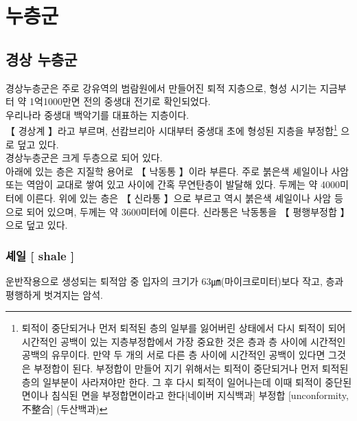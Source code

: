 \documentclass[12pt,a4paper]{book}
\newcommand{\SectionMargin}			{\newpage  \null \vskip 0cm}
\begin{document}
%
%
%
	\newpage
	\chapter{누층군}

	\SectionMargin
	\section{경상 누층군}
	\null

경상누층군은 주로 강유역의 범람원에서 만들어진 퇴적 지층으로, 형성 시기는 지금부터 약 1억1000만면 전의 중생대 전기로 확인되었다.\\

우리나라 중생대 백악기를 대표하는 지층이다.\\

【 경상계 】라고 부르며, 선캄브리아 시대부터 중생대 초에 형성된 지층을 부정합\footnote{퇴적이 중단되거나 먼저 퇴적된 층의 일부를 잃어버린 상태에서 다시 퇴적이 되어 시간적인 공백이 있는 지층부정합에서 가장 중요한 것은 층과 층 사이에 시간적인 공백의 유무이다. 만약 두 개의 서로 다른 층 사이에 시간적인 공백이 있다면 그것은 부정합이 된다. 부정합이 만들어 지기 위해서는 퇴적이 중단되거나 먼저 퇴적된 층의 일부분이 사라져야만 한다. 그 후 다시 퇴적이 일어나는데 이때 퇴적이 중단된 면이나 침식된 면을 부정합면이라고 한다[네이버 지식백과] 부정합 [unconformity, 不整合] (두산백과)} 으로 덮고 있다.\\

경상누층군은 크게 두층으로 되어 있다. \\
아래에 있는 층은 지질학 용어로 【 낙동통 】이라 부른다. 주로 붉은색 셰일이나 사암 또는 역암이 교대로 쌓여 있고 사이에 간혹 무연탄층이 발달해 있다. 두께는 약 4000미터에 이른다. 
위에 있는 층은 【 신라통 】으로 부르고 역시 붉은색 셰일이나 사암 등으로 되어 있으며, 두께는 약 3600미터에 이른다. 신라통은 낙동통을 【 평행부정합 】으로 덮고 있다.

		\newpage
		\subsection{셰일 [ shale ] }


		운반작용으로 생성되는 퇴적암 중 입자의 크기가 63㎛(마이크로미터)보다 작고, 층과 평행하게 벗겨지는 암석.\\
\end{document}
